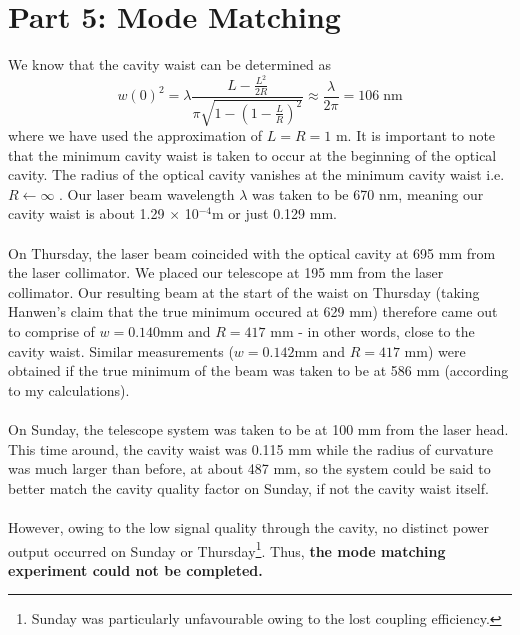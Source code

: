\documentclass[10pt,a4paper]{article}
\begin{document}
\section*{Part 5: Mode Matching}
We know that the cavity waist can be determined as 
$$ w(0)^{2} = \lambda\dfrac{L - \frac{L^{2}}{2R}}{\pi\sqrt{1 - \left(1 - \frac{L}{R}\right)^{2}}} \approx \dfrac{\lambda}{2\pi} = 106\;\mathrm{nm}$$
where we have used the approximation of $L = R = 1$ m. It is important to note that the minimum cavity waist is taken to occur at the beginning of the optical cavity. The radius of the optical cavity vanishes at the minimum cavity waist i.e. $R \leftarrow \infty$ . Our laser beam wavelength $\lambda$ was taken to be 670 nm, meaning our cavity waist is about 1.29 $\times$ 10$^{-4}$m or just 0.129 mm.\\
\\
On Thursday, the laser beam coincided with the optical cavity at 695 mm from the laser collimator. We placed our telescope at 195 mm from the laser collimator. Our resulting beam at the start of the waist on Thursday (taking Hanwen's claim that the true minimum occured at 629 mm) therefore came out to comprise of $w = 0.140$mm and $R = 417$ mm - in other words, close to the cavity waist. Similar measurements ($w = 0.142$mm and $R = 417$ mm) were obtained if the true minimum of the beam was taken to be at 586 mm (according to my calculations).\\
\\
On Sunday, the telescope system was taken to be at 100 mm from the laser head. This time around, the cavity waist was 0.115 mm while the radius of curvature was much larger than before, at about 487 mm, so the system could be said to better match the cavity quality factor on Sunday, if not the cavity waist itself.\\
\\
However, owing to the low signal quality through the cavity, no distinct power output occurred on Sunday or Thursday\footnote{Sunday was particularly unfavourable owing to the lost coupling efficiency.}. Thus, \textbf{the mode matching experiment could not be completed.}
\end{document}
